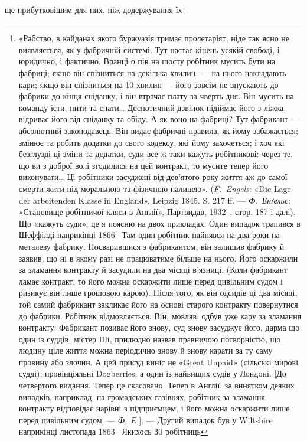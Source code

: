 ще прибутковішим для них, ніж додержування їх\footnote{
«Рабство, в кайданах якого буржуазія тримає пролетаріят, ніде
так ясно не виявляється, як у фабричній системі. Тут настає кінець
усякій свободі, і юридично, і фактично. Вранці о пів на шосту робітник
мусить бути на фабриці; якщо він спізниться на декілька хвилин, — на
нього накладають кари; якщо він спізниться на 10 хвилин — його зовсім
не впускають до фабрики до кінця сніданку, і він втрачає плату за
чверть дня. Він мусить на команду їсти, пити та спати\dots{} Деспотичний
дзвінок підіймає його з ліжка, відриває його від сніданку та обіду. А як
воно на фабриці? Тут фабрикант — абсолютний законодавець. Він видає
фабричні правила, як йому забажається; змінює та робить додатки
до свого кодексу, які йому захочеться; і хоч які безглузді ці зміни та
додатки, суди все ж таки кажуть робітникові: через те, що ви з доброї
волі згодилися на цей контракт, то мусите тепер його виконувати\dots{} Ці
робітники засуджені від дев’ятого року життя аж до самої смерти жити
під моральною та фізичною палицею». (\emph{F.~Engels}: «Die Lage der
arbeitenden Klasse in England», Leipzig 1845. S. 217 ff. — \emph{Ф.~Енґельс}:
«Становище робітничої кляси в Англії», Партвидав, 1932~, стор. 187 і
далі). Що «кажуть суди», це я поясню на двох прикладах. Один випадок
трапився в Шеффілді наприкінці 1866~ Там один робітник найнявся
на два роки на металеву фабрику. Посварившися з фабрикантом,
він залишив фабрику й заявив, що ні в якому разі не працюватиме
більше на нього. Його оскаржили за зламання контракту й засудили
на два місяці в’язниці. (Коли фабрикант ламає контракт, то його можна
оскаржити лише перед цивільним судом і ризикує він лише грошовою
карою). Після того, як він одсидів ці два місяці, той самий фабрикант
закликає його на основі старого контракту повернутися до фабрики.
Робітник відмовляється. Він, мовляв, одбув уже кару за зламання контракту.
Фабрикант позиває його знову, суд знову засуджує його, дарма
що один із суддів, містер Ші, прилюдно назвав правничою потворністю,
що людину ціле життя можна періодично знову й знову карати за ту саму
провину або злочин. А цей присуд виніс не «Great Unpaid» (сільські
мирові судді), провінціяльні Dogberries, а один із найвищих судів у
Лондоні. [До четвертого видання. Тепер це скасовано. Тепер в Англії,
за винятком деяких випадків, наприклад, на громадських газівнях, робітник
за зламання контракту відповідає нарівні з підприємцем, і його
можна оскаржити лише перед цивільним судом. — \emph{Ф.~Е.}]. — Другий
випадок був у Wiltshire наприкінці листопада 1863~ Якихось З0 робітниць
}
